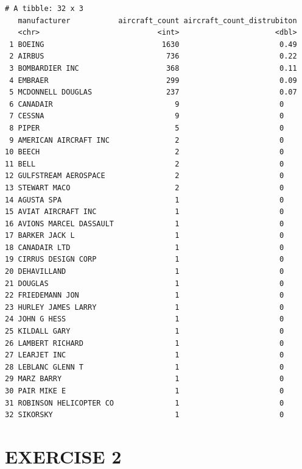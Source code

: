 \documentclass[
  letterpaper,
  DIV=11,
  numbers=noendperiod]{scrreprt}
\begin{document}
\begin{verbatim}
# A tibble: 32 x 3
   manufacturer           aircraft_count aircraft_count_distrubiton
   <chr>                           <int>                      <dbl>
 1 BOEING                           1630                       0.49
 2 AIRBUS                            736                       0.22
 3 BOMBARDIER INC                    368                       0.11
 4 EMBRAER                           299                       0.09
 5 MCDONNELL DOUGLAS                 237                       0.07
 6 CANADAIR                            9                       0   
 7 CESSNA                              9                       0   
 8 PIPER                               5                       0   
 9 AMERICAN AIRCRAFT INC               2                       0   
10 BEECH                               2                       0   
11 BELL                                2                       0   
12 GULFSTREAM AEROSPACE                2                       0   
13 STEWART MACO                        2                       0   
14 AGUSTA SPA                          1                       0   
15 AVIAT AIRCRAFT INC                  1                       0   
16 AVIONS MARCEL DASSAULT              1                       0   
17 BARKER JACK L                       1                       0   
18 CANADAIR LTD                        1                       0   
19 CIRRUS DESIGN CORP                  1                       0   
20 DEHAVILLAND                         1                       0   
21 DOUGLAS                             1                       0   
22 FRIEDEMANN JON                      1                       0   
23 HURLEY JAMES LARRY                  1                       0   
24 JOHN G HESS                         1                       0   
25 KILDALL GARY                        1                       0   
26 LAMBERT RICHARD                     1                       0   
27 LEARJET INC                         1                       0   
28 LEBLANC GLENN T                     1                       0   
29 MARZ BARRY                          1                       0   
30 PAIR MIKE E                         1                       0   
31 ROBINSON HELICOPTER CO              1                       0   
32 SIKORSKY                            1                       0   
\end{verbatim}

\hypertarget{exercise-2}{%
\section{EXERCISE 2}\label{exercise-2}}
\end{document}

